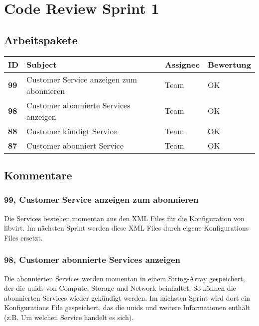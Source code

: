 
\chapter{Code Review Sprint 1}
\section{Arbeitspakete}

\begin{center}

\begin{tabularx}{\linewidth}{l l l l}
\textbf{ID} & \textbf{Subject} & \textbf{Assignee} & \textbf{Bewertung}\\
\hline
\textbf{99} & Customer Service anzeigen zum abonnieren & Team & OK \\
\textbf{98} & Customer abonnierte Services anzeigen & Team & OK\\
\textbf{88} & Customer kündigt Service & Team & OK\\
\textbf{87} & Customer abonniert Service & Team & OK\\
\end{tabularx}

\end{center}
\newpage

\section{Kommentare}

\subsection{99, Customer Service anzeigen zum abonnieren}
Die Services bestehen momentan aus den XML Files für die Konfiguration von libvirt. Im nächsten Sprint werden diese XML Files durch eigene Konfigurations Files ersetzt.\\

\subsection{98, Customer abonnierte Services anzeigen}
Die abonnierten Services werden momentan in einem String-Array gespeichert, der die uuids von Compute, Storage und Network beinhaltet. So können die abonnierten Services wieder gekündigt werden.
Im nächsten Sprint wird dort ein Konfigurations File gespeichert, das die uuids und weitere Informationen enthält (z.B. Um welchen Service handelt es sich).

